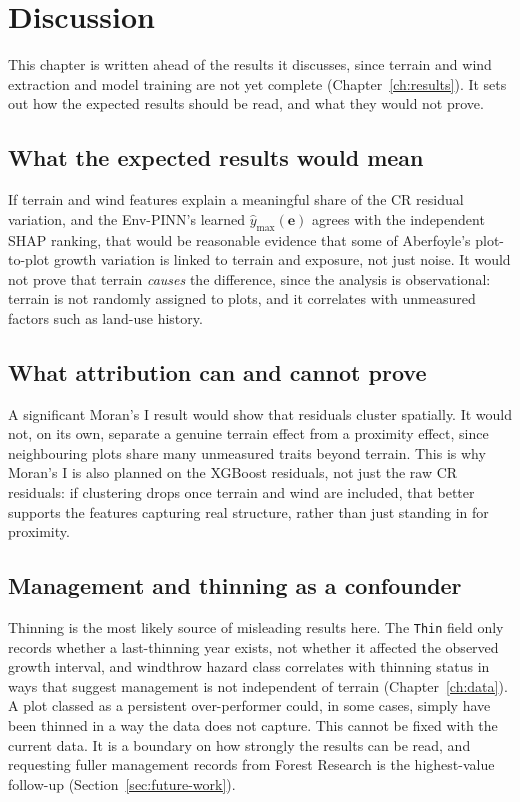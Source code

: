 \chapter{Discussion}
\label{ch:discussion}

This chapter is written ahead of the results it discusses, since terrain and wind extraction and model training are not yet complete (Chapter~\ref{ch:results}). It sets out how the expected results should be read, and what they would not prove.

\section{What the expected results would mean}

If terrain and wind features explain a meaningful share of the CR residual variation, and the Env-PINN's learned $\hat{y}_{\max}(\mathbf{e})$ agrees with the independent SHAP ranking, that would be reasonable evidence that some of Aberfoyle's plot-to-plot growth variation is linked to terrain and exposure, not just noise. It would not prove that terrain \emph{causes} the difference, since the analysis is observational: terrain is not randomly assigned to plots, and it correlates with unmeasured factors such as land-use history.

\section{What attribution can and cannot prove}

A significant Moran's I result would show that residuals cluster spatially. It would not, on its own, separate a genuine terrain effect from a proximity effect, since neighbouring plots share many unmeasured traits beyond terrain. This is why Moran's I is also planned on the XGBoost residuals, not just the raw CR residuals: if clustering drops once terrain and wind are included, that better supports the features capturing real structure, rather than just standing in for proximity.

\section{Management and thinning as a confounder}

Thinning is the most likely source of misleading results here. The \texttt{Thin} field only records whether a last-thinning year exists, not whether it affected the observed growth interval, and windthrow hazard class correlates with thinning status in ways that suggest management is not independent of terrain (Chapter~\ref{ch:data}). A plot classed as a persistent over-performer could, in some cases, simply have been thinned in a way the data does not capture. This cannot be fixed with the current data. It is a boundary on how strongly the results can be read, and requesting fuller management records from Forest Research is the highest-value follow-up (Section~\ref{sec:future-work}).

